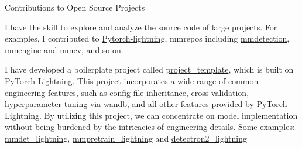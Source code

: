 \begin{cventries}
	\cventry
	{} %
	{Contributions to Open Source Projects} %
	{\hfill} %
	{} %
	{
		\vspace{-3.5mm}
		\begin{cvitems} %
			\item{I have the skill to explore and analyze the source code of large projects. For examples, I contributed to \href{https://github.com/Lightning-AI/lightning}{\textcolor{link}{Pytorch-lightning}}, mmrepos including \href{https://github.com/open-mmlab/mmdetection}{\textcolor{link}{mmdetection}}, \href{https://github.com/open-mmlab/mmengine}{\textcolor{link}{mmengine}} and \href{https://github.com/open-mmlab/mmcv}{\textcolor{link}{mmcv}}, and so on.}
			\item{I have developed a boilerplate project called \href{https://github.com/shenmishajing/project_template}{\textcolor{link}{project\_template}}, which is built on PyTorch Lightning. This project incorporates a wide range of common engineering features, such as config file inheritance, cross-validation, hyperparameter tuning via wandb, and all other features provided by PyTorch Lightning. By utilizing this project, we can concentrate on model implementation without being burdened by the intricacies of engineering details. Some examples: \href{https://github.com/shenmishajing/mmdet_lightning}{\textcolor{link}{mmdet\_lightning}}, \href{https://github.com/shenmishajing/mmpretrain_lightning}{\textcolor{link}{mmpretrain\_lightning}} and \href{https://github.com/shenmishajing/detectron2_lightning}{\textcolor{link}{detectron2\_lightning}} }
		\end{cvitems}
	}
\end{cventries}
